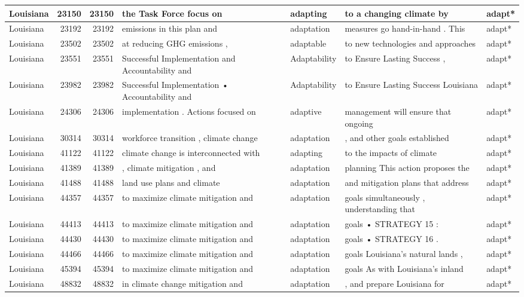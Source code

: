 \documentclass[
]{article}
\begin{document}
\begin{table}
\begin{tabular}[t]{l|r|r|l|l|l|l}
\hline
Louisiana & 23150 & 23150 & the Task Force focus on & adapting & to a changing climate by & adapt*\\
\hline
Louisiana & 23192 & 23192 & emissions in this plan and & adaptation & measures go hand-in-hand . This & adapt*\\
\hline
Louisiana & 23502 & 23502 & at reducing GHG emissions , & adaptable & to new technologies and approaches & adapt*\\
\hline
Louisiana & 23551 & 23551 & Successful Implementation and Accountability and & Adaptability & to Ensure Lasting Success , & adapt*\\
\hline
Louisiana & 23982 & 23982 & Successful Implementation • Accountability and & Adaptability & to Ensure Lasting Success Louisiana & adapt*\\
\hline
Louisiana & 24306 & 24306 & implementation . Actions focused on & adaptive & management will ensure that ongoing & adapt*\\
\hline
Louisiana & 30314 & 30314 & workforce transition , climate change & adaptation & , and other goals established & adapt*\\
\hline
Louisiana & 41122 & 41122 & climate change is interconnected with & adapting & to the impacts of climate & adapt*\\
\hline
Louisiana & 41389 & 41389 & , climate mitigation , and & adaptation & planning This action proposes the & adapt*\\
\hline
Louisiana & 41488 & 41488 & land use plans and climate & adaptation & and mitigation plans that address & adapt*\\
\hline
Louisiana & 44357 & 44357 & to maximize climate mitigation and & adaptation & goals simultaneously , understanding that & adapt*\\
\hline
Louisiana & 44413 & 44413 & to maximize climate mitigation and & adaptation & goals • STRATEGY 15 : & adapt*\\
\hline
Louisiana & 44430 & 44430 & to maximize climate mitigation and & adaptation & goals • STRATEGY 16 . & adapt*\\
\hline
Louisiana & 44466 & 44466 & to maximize climate mitigation and & adaptation & goals Louisiana’s natural lands , & adapt*\\
\hline
Louisiana & 45394 & 45394 & to maximize climate mitigation and & adaptation & goals As with Louisiana’s inland & adapt*\\
\hline
Louisiana & 48832 & 48832 & in climate change mitigation and & adaptation & , and prepare Louisiana for & adapt*\\

\end{tabular}
\end{table}
\end{document}
